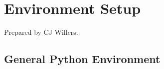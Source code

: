 
\chapter{Environment Setup}
\label{sec:EnvironmentSetup}

Prepared by CJ Willers.

\section{General Python Environment}



